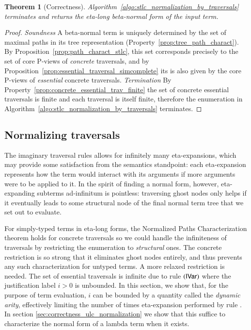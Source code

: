 \documentclass{elsarticle}
\theoremstyle{plain}
\newtheorem{theorem}{Theorem}[section]
\theoremstyle{definition}
\begin{document}
\begin{theorem}[Correctness]
Algorithm~\ref{algo:stlc_normalization_by_traversals} terminates and returns the eta-long beta-normal form of the input term.
\end{theorem}
\begin{proof}
\emph{Soundness} A beta-normal term is uniquely determined by the set of maximal paths in its tree representation (Property~\ref{prop:tree_path_charact}). By Proposition~\ref{prop:path_charact_stlc}, this set corresponds precisely to the set of core P-views of \emph{concrete} traversals,
and by Proposition~\ref{prop:essential_traversal_simcomplete} its is also given by the core P-views of \emph{essential} concrete traversals.
\emph{Termination} By Property~\ref{prop:concrete_essential_trav_finite} the set of concrete essential traversals is finite and each traversal is itself finite, therefore the enumeration in Algorithm~\ref{algo:stlc_normalization_by_traversals} terminates.
\end{proof}

\subsection{Normalizing traversals}

The imaginary traversal rules allows for infinitely many eta-expansions, which may provide some satisfaction from the semantics standpoint: each eta-expansion represents how the term would interact with its arguments if more arguments were to be applied to it. In the spirit of finding a normal form, however, eta-expanding subterms ad-infinitum is pointless: traversing ghost nodes only helps if it eventually leads to some structural node of the final normal term tree that we set out to evaluate.

For simply-typed terms in eta-long forms, the
Normalized Paths Characterization theorem holds for concrete traversals so we could  handle the infiniteness of traversals by restricting the enumeration to \emph{structural} ones. The concrete restriction
is so strong that it eliminates ghost nodes entirely, and thus prevents any such characterization for untyped terms. A more relaxed restriction is needed.
The set of essential traversals is infinite due to rule $\mathbf{({\sf IVar})}$ where the justification label $i>0$ is unbounded. In this section, we show that, for the purpose of term evaluation, $i$ can be bounded by a quantity called the \emph{dynamic arity}, effectively limiting the number of times eta-expansion performed by rule . In section \ref{sec:correctness_ulc_normalization} we show that this suffice to characterize the normal form of a lambda term when it exists.
\end{document}
